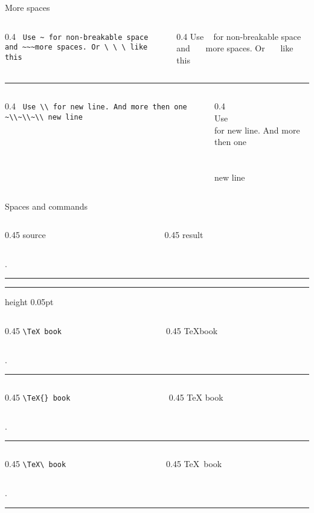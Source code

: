 \begin{frame}[fragile]{More spaces}\relax
\begin{columns}
\begin{column}{0.4\textwidth}
     \lstinline[basicstyle=\tt\normalsize]| Use ~ for non-breakable space and ~~~more spaces. Or \ \ \ like this|
\end{column}
\begin{column}{0.4\textwidth}
     Use ~ for non-breakable space and ~~~more spaces. Or \ \ \ like this
\end{column}
\end{columns}
\hrule
\begin{columns}
\begin{column}{0.4\textwidth}
     \lstinline[basicstyle=\tt\normalsize]| Use \\ for new line. And more then one ~\\~\\~\\ new line|
\end{column}
\begin{column}{0.4\textwidth}
~\\
     Use \\ for new line. And more then one ~\\~\\~\\ new line
\end{column}
\end{columns}

\end{frame}

\begin{frame}[fragile]{Spaces and commands}\relax

\newcommand{\appendTline}[2]{\vspace*{10pt}\begin{columns}
        \begin{column}{0.45\textwidth}
          \hfill #1 
        \end{column}
        \begin{column}{0.45\textwidth}
             \hfill #2\hfill \hfill
        \end{column}
    \end{columns}
    \vphantom.
    \hrule
    }

    \cprotect[mm]\appendTline{\csk source}{\csk result}
    \hrule height 0.05pt
    \cprotect[mm]\appendTline{\lstinline[basicstyle=\tt\normalsize,showspaces=true]|\TeX book|}{\TeX book}
    \cprotect[mm]\appendTline{\lstinline[basicstyle=\tt\normalsize,showspaces=true]|\TeX{} book|}{\TeX{} book}
    \cprotect[mm]\appendTline{\lstinline[basicstyle=\tt\normalsize,showspaces=true]|\TeX\ book|}{\TeX\ book}

\end{frame}

